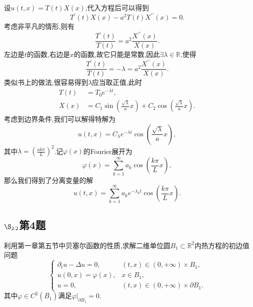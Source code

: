 \documentclass[12pt, a4paper]{ctexbook}
\begin{document}
    设$u(t,x) = T(t)X(x)$,代入方程后可以得到
    \begin{equation*}
    T^{\prime}(t)X(x)-a^2T(t)X^{\prime\prime}(x) =0.
    \end{equation*}
    考虑非平凡的情形,则有
    \begin{equation*}
    \frac{T^{\prime}(t)}{T(t)} = a^2 \frac{X^{\prime\prime}(x)}{X(x)}.
    \end{equation*}
    左边是$t$的函数,右边是$x$的函数,故它只能是常数,因此$\exists \lambda \in \mathbb{R}$,使得
    \begin{equation*}
    \frac{T^{\prime}(t)}{T(t)} = -\lambda=a^2 \frac{X^{\prime\prime}(x)}{X(x)}.
    \end{equation*}
    类似书上的做法,很容易得到$\lambda$应当取正值,此时
    \begin{align*}
    T(t)&=T_0 e^{-\lambda t},\\
    X(x) &=C_1 \sin(\frac{\sqrt{\lambda}}{a}x)+C_2 \cos(\frac{\sqrt{\lambda}}{a}x).
    \end{align*}
    考虑到边界条件,我们可以解得特解为
    \begin{equation*}
    u(t,x) = C_{\lambda} e^{-\lambda t}\cos(\frac{\sqrt{\lambda}}{a}x),
    \end{equation*}
    其中$\lambda = \left(\frac{ak\pi}{L}\right)^2 $.记$\varphi(x)$的Fourier展开为
    \begin{equation*}
    \varphi(x) = \sum_{k=1}^{\infty} a_k \cos(\frac{k\pi}{L}x),
    \end{equation*}
    那么我们得到了分离变量的解
    \begin{equation*}
    u(t,x) = \sum_{k=1}^{\infty} a_k e^{-\lambda_k t}\cos(\frac{k\pi}{L}x).
    \end{equation*}
    
    \subsection{$\S_{2.2}$第4题}
    \kaishu{}利用第一章第五节中贝塞尔函数的性质,求解二维单位圆$B_1 \subset \mathbb{R}^2$内热方程的初边值问题
    \begin{equation*}
    \begin{cases}
    \partial_t u - \Delta u = 0, &(t,x) \in (0,+\infty) \times B_1,\\
    u(0,x) = \varphi(x),&x \in B_1,\\
    u = 0, &(t,x) \in (0,+\infty) \times \partial B_1.
    \end{cases}
    \end{equation*}
    其中$\varphi \in C^2(\overline{B_1})$满足$\left.\varphi \right|_{\partial B_1} = 0$.\\
    
\end{document}
